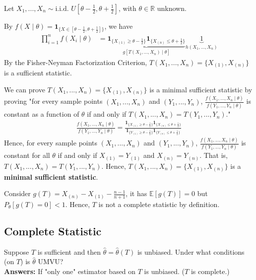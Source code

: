 \documentclass[11pt]{elegantbook}
\begin{document}
\begin{example}
    Let $X_1,...,X_n\sim \text{i.i.d. }U[\theta -\frac{1}{2},\theta + \frac{1}{2}]$, with $\theta \in \mathbb{R}$ unknown.

    By $f(X\mid\theta)=\mathbf{1}_{\{X\in[\theta-\frac{1}{2},\theta+\frac{1}{2}]\}}$, we have
    \begin{equation}
        \begin{aligned}
            \prod_{i=1}^n f(X_i\mid\theta)&=\underbrace{\mathbf{1}_{\{X_{(1)}\geq\theta-\frac{1}{2}\}}\mathbf{1}_{\{X_{(n)}\leq\theta+\frac{1}{2}\}}}_{g[T(X_1,...,X_n)\mid\theta]}\underbrace{1}_{h(X_1,...,X_n)}
        \end{aligned}
        \nonumber
    \end{equation}
    By the Fisher-Neyman Factorization Criterion, $T(X_1,...,X_n)=\{X_{(1)},X_{(n)}\}$ is a sufficient statistic.

    We can prove $T(X_1,...,X_n)=\{X_{(1)},X_{(n)}\}$ is a minimal sufficient statistic by proving "for every sample points $(X_1,...,X_n)$ and $(Y_1,...,Y_n)$, $\frac{f(X_1,...,X_n\mid\theta)}{f(Y_1,...,Y_n\mid\theta)}$ is constant as a function of $\theta$ if and only if $T(X_1,...,X_n)=T(Y_1,...,Y_n)$."
    \begin{equation}
        \begin{aligned}
            \frac{f(X_1,...,X_n\mid\theta)}{f(Y_1,...,Y_n\mid\theta)}=\frac{\mathbf{1}_{\{X_{(1)}\geq\theta-\frac{1}{2}\}}\mathbf{1}_{\{X_{(n)}\leq\theta+\frac{1}{2}\}}}{\mathbf{1}_{\{Y_{(1)}\geq\theta-\frac{1}{2}\}}\mathbf{1}_{\{Y_{(n)}\leq\theta+\frac{1}{2}\}}}
        \end{aligned}
        \nonumber
    \end{equation}
    Hence, for every sample points $(X_1,...,X_n)$ and $(Y_1,...,Y_n)$, $\frac{f(X_1,...,X_n\mid\theta)}{f(Y_1,...,Y_n\mid\theta)}$ is constant for all $\theta$ if and only if $X_{(1)}=Y_{(1)}$ and $X_{(n)}=Y_{(n)}$. That is, $T(X_1,...,X_n)=T(Y_1,...,Y_n)$. Hence, $T(X_1,...,X_n)=\{X_{(1)},X_{(n)}\}$ is a \textbf{minimal sufficient statistic}.

    Consider $g(T)=X_{(n)}-X_{(1)}-\frac{n-1}{n+1}$, it has $\mathbb{E}[g(T)]=0$ but $P_\theta[g(T)=0]<1$. Hence, $T$ is not a complete statistic by definition.
\end{example}



\subsection{Complete Statistic}
Suppose $T$ is sufficient and then $\hat{\theta}=\hat{\theta}(T)$ is unbiased. Under what conditions (on $T$) is $\hat{\theta}$ UMVU?\\
\textbf{Answers:} If "only one" estimator based on $T$ is unbiased. ($T$ is complete.)
\end{document}
